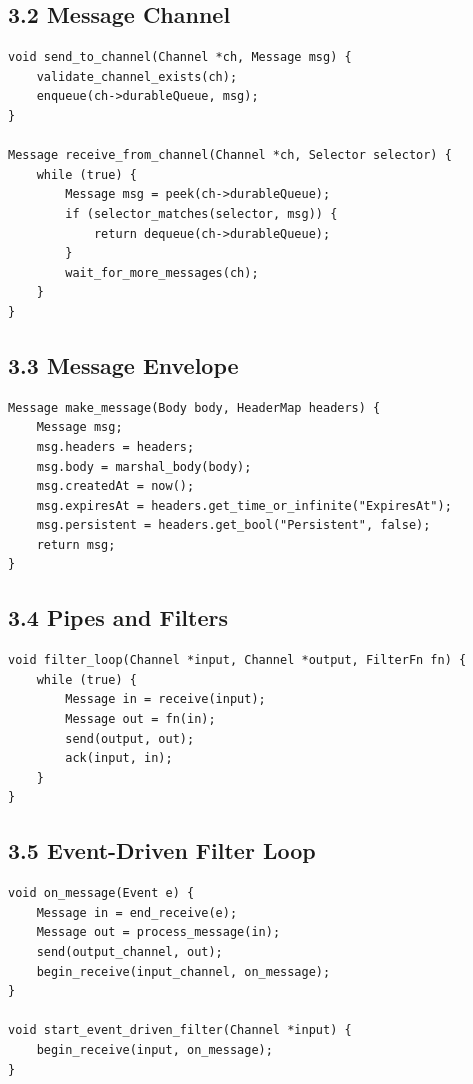 \documentclass[11pt]{article}
\begin{document}
\subsection{3.2 Message Channel}\label{message-channel}

\begin{verbatim}
void send_to_channel(Channel *ch, Message msg) {
    validate_channel_exists(ch);
    enqueue(ch->durableQueue, msg);
}

Message receive_from_channel(Channel *ch, Selector selector) {
    while (true) {
        Message msg = peek(ch->durableQueue);
        if (selector_matches(selector, msg)) {
            return dequeue(ch->durableQueue);
        }
        wait_for_more_messages(ch);
    }
}
\end{verbatim}

\subsection{3.3 Message Envelope}\label{message-envelope}

\begin{verbatim}
Message make_message(Body body, HeaderMap headers) {
    Message msg;
    msg.headers = headers;
    msg.body = marshal_body(body);
    msg.createdAt = now();
    msg.expiresAt = headers.get_time_or_infinite("ExpiresAt");
    msg.persistent = headers.get_bool("Persistent", false);
    return msg;
}
\end{verbatim}

\subsection{3.4 Pipes and Filters}\label{pipes-and-filters}

\begin{verbatim}
void filter_loop(Channel *input, Channel *output, FilterFn fn) {
    while (true) {
        Message in = receive(input);
        Message out = fn(in);
        send(output, out);
        ack(input, in);
    }
}
\end{verbatim}

\subsection{3.5 Event-Driven Filter
Loop}\label{event-driven-filter-loop}

\begin{verbatim}
void on_message(Event e) {
    Message in = end_receive(e);
    Message out = process_message(in);
    send(output_channel, out);
    begin_receive(input_channel, on_message);
}

void start_event_driven_filter(Channel *input) {
    begin_receive(input, on_message);
}
\end{verbatim}
\end{document}

